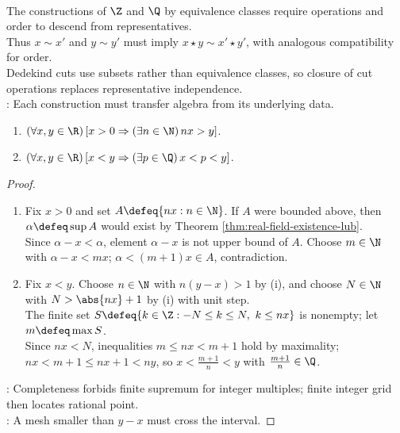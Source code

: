 \begin{perspective} \label{per:number-systems-from-representatives} \\
The constructions of $\Z$ and $\Q$ by equivalence classes require operations and order to descend from representatives.\\
Thus $x\sim x'$ and $y\sim y'$ must imply $x\star y\sim x'\star y'$, with analogous compatibility for order.\\
Dedekind cuts use subsets rather than equivalence classes, so closure of cut operations replaces representative independence.\\
: Each construction must transfer algebra from its underlying data.
\end{perspective}

\begin{theorem} \label{thm:archimedean-and-rational-density} 
\begin{enumerate}[label=(\roman*)]
\setlength{\itemsep}{0pt}
\item $(\forall x,y\in\R)\,[x>0\Rightarrow(\exists n\in\N)\,nx>y]$.
\item $(\forall x,y\in\R)\,[x<y\Rightarrow(\exists p\in\Q)\,x<p<y]$.
\end{enumerate}
\begin{proof}
\begin{enumerate}[label=(\roman*)]
\setlength{\itemsep}{0pt}
\item Fix $x>0$ and set $A\defeq\{nx:n\in\N\}$. If $A$ were bounded above, then $\alpha\defeq\sup A$ would exist by Theorem \ref{thm:real-field-existence-lub}.\\
Since $\alpha-x<\alpha$, element $\alpha-x$ is not upper bound of $A$. Choose $m\in\N$ with $\alpha-x<mx$; $\alpha<(m+1)x\in A$, contradiction.
\item Fix $x<y$. Choose $n\in\N$ with $n(y-x)>1$ by (i), and choose $N\in\N$ with $N>\abs{nx}+1$ by (i) with unit step.\\
The finite set $S\defeq\{k\in\Z:-N\leq k\leq N,\ k\leq nx\}$ is nonempty; let $m\defeq\max S$.\\
Since $nx<N$, inequalities $m\leq nx<m+1$ hold by maximality; $nx<m+1\leq nx+1<ny$, so $x<\frac{m+1}{n}<y$ with $\frac{m+1}{n}\in\Q$.
\end{enumerate}
: Completeness forbids finite supremum for integer multiples; finite integer grid then locates rational point.\\
: A mesh smaller than $y-x$ must cross the interval.
\end{proof}
\end{theorem}

